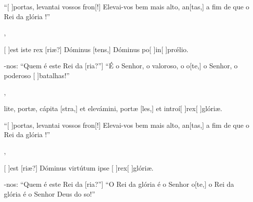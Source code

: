 {    {\item {}``[ ]{por}tas, levantai vossos fron[!] Elevai-vos bem mais alto, an[tas,] a fim de que o Rei da glória !''~\Antiphona},
  {\item {}[ ]{est} iste rex [riæ?] Dóminus [tens,] Dóminus po[ ]{in}[ ]{prœ́}lio.~\Antiphona}%
    {\item {}-nos: ``Quem é este Rei da [ria?''] ``É o Senhor, o valoroso, o o[te,] o Senhor, o poderoso [ ]{ba}{ta}lhas!''~\Antiphona},
  {\item {}lite, portæ, cápita [stra,] et elevámini, portæ [les,] et introí[ ]{rex}[ ]{gló}riæ.~\Antiphona}%
    {\item {}``[ ]{por}tas, levantai vossos fron[!] Elevai-vos bem mais alto, an[tas,] a fim de que o Rei da glória !''~\Antiphona},
  {\item {}[ ]{est} [riæ?] Dóminus virtútum ipse [ ]{rex}[ ]{gló}riæ.~\Antiphona}%
    {\item {}-nos: ``Quem é este Rei da [ria?''] ``O Rei da glória é o Senhor o[te,] o Rei da glória é o Senhor Deus do so!''~\Antiphona}
}
